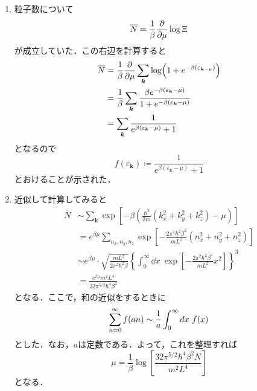 \documentclass[a4paper,pdflatex,ja=standard]{bxjsarticle}
\begin{document}
\begin{enumerate}
  \item 
  粒子数について
  \begin{equation}
    \overline{N}
    =
    \frac{1}{\beta}\pdv{}{\mu}\log\Xi
  \end{equation}
  が成立していた．この右辺を計算すると
  \begin{align}
    \overline{N}
    &=
    \frac{1}{\beta}\pdv{}{\mu}\sum_{\bm{k}}\log(1+e^{-\beta(\varepsilon_{\bm{k}-\mu})})
    \nonumber
    \\
    \nonumber
    &=
    \frac{1}{\beta}\sum_{\bm{k}}\frac{\beta e^{-\beta(\varepsilon_{\bm{k}}-\mu)}}{1+e^{-\beta(\varepsilon_{\bm{k}}-\mu)}}
    \\
    &=
    \sum_{\bm{k}}\frac{1}{e^{\beta(\varepsilon_{\bm{k}}-\mu)}+1}
  \end{align}
  となるので
  \begin{equation}
    f(\varepsilon_{\bm{k}})
    \coloneqq
    \frac{1}{e^{\beta(\varepsilon_{\bm{k}}-\mu)}+1}
  \end{equation}
  とおけることが示された．

  \item 
  近似して計算してみると
  \begin{align}
    \overline{N}
    &\sim
    \sum_{\bm{k}}
    \exp\left[ -\beta\left( \frac{\hbar^2}{2m}(k_{x}^2+k_{y}^{2}+k_{z}^2)-\mu \right) \right]
    \nonumber
    \\
    &=
    e^{\beta\mu}\sum_{n_{x},n_{y},n_{z}}\exp\left[ -\frac{2\pi^2\hbar^2\beta^2}{mL^2}\left( n_{x}^2+n_{y}^2+n_{z}^2 \right) \right]
    \nonumber
    \\
    &\sim
    e^{\beta\mu}\cdot\sqrt{\frac{mL^2}{2\pi^2\hbar^2\beta}}\left\{ \int_{0}^{\infty}\dd x\ \exp\left[ -\frac{2\pi^2\hbar^2\beta^2}{mL^2}x^2 \right] \right\}^3
    \nonumber
    \\
    &=
    \frac{e^{\beta\mu}m^2 L^4}{32\pi^{5/2}\hbar^4 \beta^2}
  \end{align}
  となる．ここで，和の近似をするときに
  \begin{equation}
    \sum_{n=0}^{\infty}f(an)
    \sim
    \frac{1}{a}\int_{0}^{\infty}\\dx\ f(x)
  \end{equation}
  とした．なお，$a$は定数である．よって，これを整理すれば
  \begin{equation}
    \mu
    =
    \frac{1}{\beta}\log\left[ \frac{32\pi^{5/2}\hbar^4\beta^2 N}{m^2 L^4} \right]
  \end{equation}
  となる．


\end{enumerate}
\end{document}
